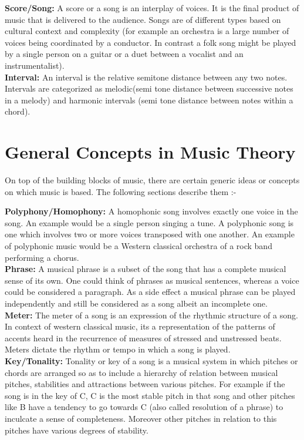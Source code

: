 \noindent \textbf{Score/Song:} A score or a song is an interplay of voices. It is the final product of music that is delivered to the audience. Songs are of different types based on cultural context and complexity (for example an orchestra is a large number of voices being coordinated by a conductor. In contrast a folk song might be played by a single person on a guitar or a duet between a vocalist and an instrumentalist). \\

\noindent \textbf{Interval:} An interval is the relative semitone distance between any two notes. Intervals are categorized as melodic(semi tone distance between successive notes in a melody) and harmonic intervals (semi tone distance between notes within a chord). \\

\section{General Concepts in Music Theory}

\noindent On top of the building blocks of music, there are certain generic ideas or concepts on which music is based. The following sections describe them :-

\noindent \textbf{Polyphony/Homophony:} A homophonic song involves exactly one voice in the song. An example would be a single person singing a tune. A polyphonic song is one which involves two or more voices transposed with one another. An example of polyphonic music would be a Western classical orchestra of a rock band performing a chorus. \\

\noindent \textbf{Phrase:} A musical phrase is a subset of the song that has a complete musical sense of its own. One could think of phrases as musical sentences, whereas a voice could be considered a paragraph. As a side effect a musical phrase can be played independently and still be considered as a song albeit an incomplete one. \\

\noindent \textbf{Meter:} The meter of a song is an expression of the rhythmic structure of a song. In context of western classical music, its a representation of the patterns of accents heard in the recurrence of measures of stressed and unstressed beats. Meters dictate the rhythm or tempo in which a song is played. \\

\noindent \textbf{Key/Tonality:} Tonality or key of a song is a musical system in which pitches or chords are arranged so as to include a hierarchy of relation between musical pitches, stabilities and attractions between various pitches. For example if the song is in the key of C, C is the most stable pitch in that song and other pitches like B have a tendency to go towards C (also called resolution of a phrase) to inculcate a sense of completeness. Moreover other pitches in relation to this pitches have various degrees of stability. \\

